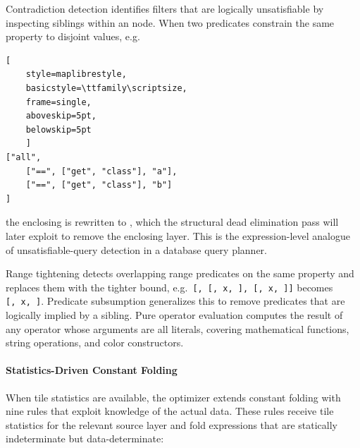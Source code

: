 Contradiction detection identifies filters that are logically unsatisfiable by inspecting siblings within an  node.
When two predicates constrain the same property to disjoint values, e.g.

\begin{lstlisting}[
	style=maplibrestyle,
	basicstyle=\ttfamily\scriptsize,
	frame=single,
	aboveskip=5pt,
	belowskip=5pt
	]
["all",
	["==", ["get", "class"], "a"],
	["==", ["get", "class"], "b"]
]
\end{lstlisting}

\noindent the enclosing  is rewritten to , which the structural dead elimination pass will later exploit to remove the enclosing layer.
This is the expression-level analogue of unsatisfiable-query detection in a database query planner.

Range tightening detects overlapping range predicates on the same property and replaces them with the tighter bound, e.g.\ \texttt{[,~[,~x,~],~[,~x,~]]} becomes \texttt{[,~x,~]}.
Predicate subsumption generalizes this to remove predicates that are logically implied by a sibling.
Pure operator evaluation computes the result of any operator whose arguments are all literals, covering mathematical functions, string operations, and color constructors.

\paragraph{Statistics-Driven Constant Folding}
When tile statistics are available, the optimizer extends constant folding with nine rules that exploit knowledge of the actual data.
These rules receive tile statistics for the relevant source layer and fold expressions that are statically indeterminate but data-determinate:

